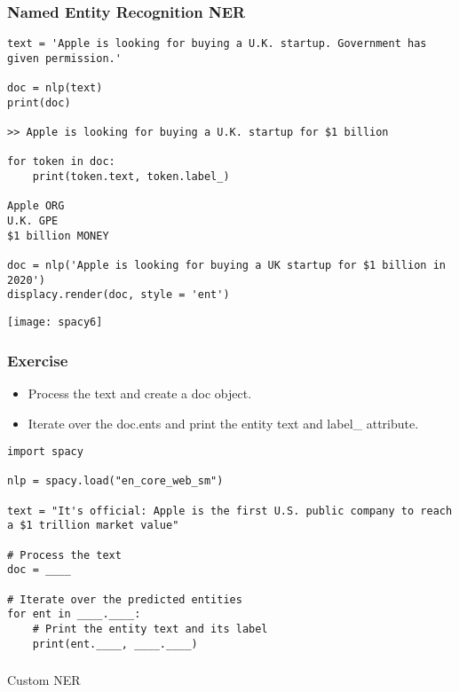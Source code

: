 \begin{frame}[fragile]\frametitle{Named Entity Recognition NER}

\begin{lstlisting}
text = 'Apple is looking for buying a U.K. startup. Government has given permission.'

doc = nlp(text)
print(doc)

>> Apple is looking for buying a U.K. startup for $1 billion

for token in doc:
    print(token.text, token.label_)

Apple ORG
U.K. GPE
$1 billion MONEY

doc = nlp('Apple is looking for buying a UK startup for $1 billion in 2020')
displacy.render(doc, style = 'ent')
\end{lstlisting}

\begin{center}
\texttt{[image: spacy6]}
\end{center}

\end{frame}

\begin{frame}[fragile]\frametitle{Exercise}

  \begin{itemize}
    \item Process the text and create a doc object.
    \item Iterate over the doc.ents and print the entity text and label\_ attribute.
  \end{itemize}

  \begin{lstlisting}
import spacy

nlp = spacy.load("en_core_web_sm")

text = "It's official: Apple is the first U.S. public company to reach a $1 trillion market value"

# Process the text
doc = ____

# Iterate over the predicted entities
for ent in ____.____:
    # Print the entity text and its label
    print(ent.____, ____.____)
  \end{lstlisting}
	
\end{frame}

\begin{frame}[fragile]\frametitle{}

\begin{center}
{\Large Custom NER}
\end{center}
\end{frame}


